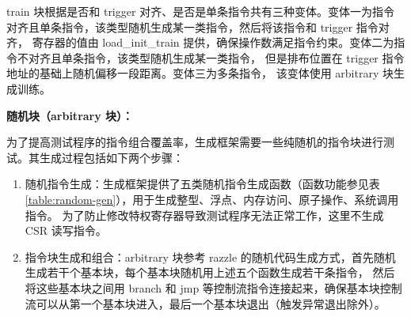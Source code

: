 train 块根据是否和 trigger 对齐、是否是单条指令共有三种变体。变体一为指令对齐且单条指令，该类型随机生成某一类指令，然后将该指令和 trigger 指令对齐，
寄存器的值由 load\_init\_train 提供，确保操作数满足指令约束。变体二为指令不对齐且单条指令，该类型随机生成某一类指令，
但是排布位置在 trigger 指令地址的基础上随机偏移一段距离。变体三为多条指令，
该变体使用 arbitrary 块生成训练。\par

\textbf{随机块（arbitrary 块）：}\par
为了提高测试程序的指令组合覆盖率，生成框架需要一些纯随机的指令块进行测试。其生成过程包括如下两个步骤：
\begin{enumerate}
    \item 随机指令生成：生成框架提供了五类随机指令生成函数（函数功能参见表\ref{table:random-gen}），用于生成整型、浮点、内存访问、原子操作、系统调用指令。
为了防止修改特权寄存器导致测试程序无法正常工作，这里不生成 CSR 读写指令。\par
    \item 指令块生成和组合：arbitrary 块参考 razzle 的随机代码生成方式，首先随机生成若干个基本块，每个基本块随机用上述五个函数生成若干条指令，
    然后将这些基本块之间用 branch 和 jmp 等控制流指令连接起来，确保基本块控制流可以从第一个基本块进入，最后一个基本块退出（触发异常退出除外）。
\end{enumerate}

\begin{table}[h!]
    \begin{center} 
    \caption{随机指令生成} 
    \label{table:random-gen}  
    \end{center}
\end{table}

